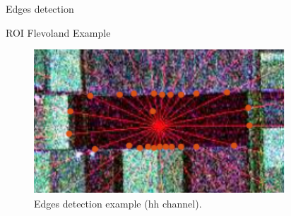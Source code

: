 \documentclass[10pt,professionalfonts]{beamer}
\begin{document}
\begin{frame}[fragile]{Edges detection}
\begin{alertblock}{ROI Flevoland Example} 
\begin{figure}[hbt]
\centering
	\includegraphics[width=.8\linewidth]{flevoland_radial_25_point_hh_crop}
	\caption{Edges detection example ($\text{hh}$ channel).}
\label{fig1}
\end{figure}
\end{alertblock}
\end{frame}

\end{document}

